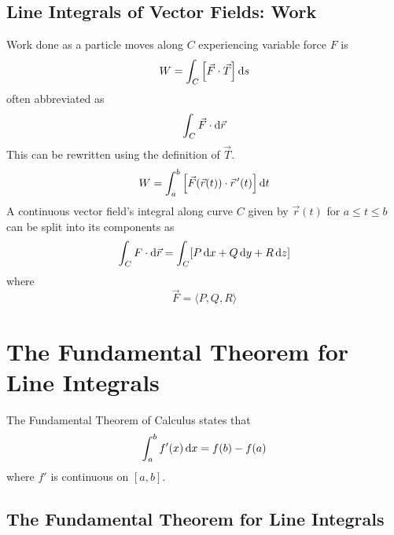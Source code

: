 \documentclass[./Calculus \Roman{3}.tex]{subfiles}
\begin{document}
		\subsection*{Line Integrals of Vector Fields: Work}
			Work done as a particle moves along $C$ experiencing variable force $F$ is
				\[W = \int_C \left[\vec{F} \cdot \vec{T}\right]\mathrm{d} s\]
				often abbreviated as
				\[\int_C \vec{F} \cdot \mathrm{d}\vec{r}\]
				This can be rewritten using the definition of $\vec{T}$.
				\[W = \int_a^b\left[\vec{F}(\vec{r}(t)) \cdot \vec{r}\hspace{0.5mm}'(t)\right]\mathrm{d} t\]
			A continuous vector field's integral along curve $C$ given by $\vec{r}(t)$ for $a \le t \le b$ can be split into its components as
				\[\int_C F \cdot \mathrm{d}\vec{r} = \int_C[P\,\mathrm{d} x + Q\,\mathrm{d} y + R\,\mathrm{d} z]\]
				where
				\[\vec{F} = \langle P, Q, R \rangle\]
	\section{The Fundamental Theorem for Line Integrals}
		The Fundamental Theorem of Calculus states that
			\[\int_a^b f'(x)\,\mathrm{d} x = f(b) - f(a)\]
			where $f'$ is continuous on $[a, b]$.
		\subsection*{The Fundamental Theorem for Line Integrals}
\end{document}
